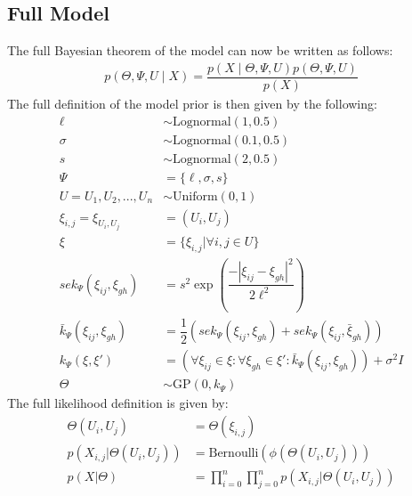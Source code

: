 \documentclass[11pt]{report} %
\begin{document}
\subsection{Full Model}
The full Bayesian theorem of the model can now be written as follows:
\begin{align}
\label{fullmodelbayes}
p(\Theta,\Psi,U\mid X)=\dfrac{p(X\mid\Theta,\Psi,U)p(\Theta,\Psi, U)}{p(X)}
\end{align}
The full definition of the model prior is then given by the following:
\begin{align}
\ell &\sim \text{Lognormal}(1,0.5)\\
\sigma &\sim \text{Lognormal}(0.1,0.5)\\
s &\sim \text{Lognormal}(2,0.5)\\
\Psi &= \{\ell, \sigma, s\}\\
U = {U_1,U_2,...,U_n} &\sim \text{Uniform}(0,1)\\
\xi_{i,j}=\xi_{U_i,U_j}&=(U_i, U_j)\\
\xi &= \{\xi_{i,j}|\forall i, j \in U \}\\
sek_\Psi(\xi_{ij}, \xi_{gh}) &= s^2\exp(\dfrac{-|\xi_{ij}-\xi_{gh}|^2}{2\ell^2})\\
\bar{k}_\Psi(\xi_{ij}, \xi_{gh}) &= \dfrac{1}{2}(sek_\Psi(\xi_{ij}, \xi_{gh}) + sek_\Psi(\xi_{ij}, \bar{\xi}_{gh}))\\
k_\Psi(\xi, \xi') &= (\forall \xi_{ij} \in \xi: \forall \xi_{gh} \in \xi': \bar{k}_\Psi(\xi_{ij}, \xi_{gh}) )+ \sigma^2I \\
\Theta &\sim \text{GP}(0,k_\Psi)
\end{align}
The full likelihood definition is given by:
\begin{align}
\Theta(U_i, U_j) &= \Theta(\xi_{i,j})\\
\label{single_edge_llh} p(X_{i,j}|\Theta(U_i, U_j)) &= \text{Bernoulli}(\phi (\Theta(U_i, U_j)))\\
\label{complete_llh}
p(X|\Theta) &=  \prod_{i=0}^n \prod_{j=0}^n p(X_{i,j}|\Theta(U_i, U_j))
\end{align}

\end{document}
